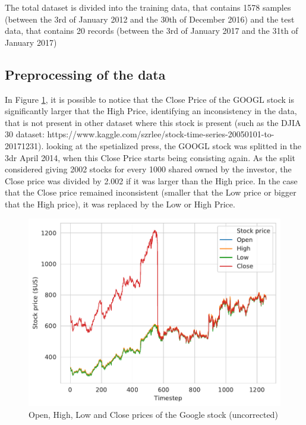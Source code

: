 \documentclass[10pt,twocolumn,letterpaper]{article}
\begin{document}
The total dataset is divided into the training data, that contains 1578 samples (between the 3rd of January 2012 and the 30th of December 2016) and the test data, that contains 20 records (between the 3rd of January 2017 and the 31th of January 2017)

\subsection{Preprocessing of the data}

In Figure \ref{fig:price}, it is possible to notice that the Close Price of the GOOGL stock is significantly larger that the High Price, identifying an inconsistency in the data, that is not present in other dataset where this stock is present (such as the DJIA 30 dataset: https://www.kaggle.com/szrlee/stock-time-series-20050101-to-20171231). looking at the spetialized press, the GOOGL stock was splitted in the 3dr April 2014, when this Close Price starts being consisting again. As the split considered giving 2002 stocks for every 1000 shared owned by the investor, the Close price was divided by 2.002 if it was larger than the High price. In the case that the Close price remained inconsistent (smaller that the Low price or bigger that the High price), it was replaced by the Low or High Price.

\begin{figure}[h]
	\begin{center}
		\includegraphics[width=1.0\linewidth]{stock_price.pdf}
	\end{center}
	\caption{Open, High, Low and Close prices of the Google stock (uncorrected)}
	\label{fig:price}
\end{figure}
\end{document}
